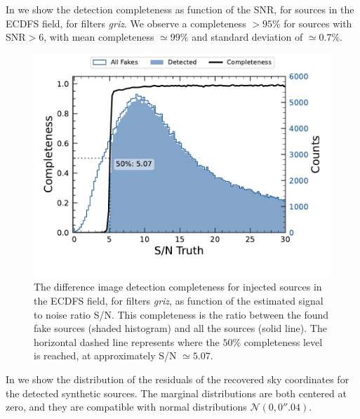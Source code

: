 In  we show the detection completeness as function of the \gls{SNR}, for sources in the \gls{ECDFS} field, for filters \textit{griz}. We observe a completeness $>95\%$ for sources with \gls{SNR}$> 6$, with mean completeness $\simeq 99\%$ and standard deviation of $\simeq 0.7\%$.
%
\begin{figure}[htb!]
\centering
\includegraphics[width=0.98\linewidth]{figures/efficiency_snr_griz.pdf}
\caption{The difference image detection completeness for injected sources in the \gls{ECDFS} field, for filters \textit{griz}, as function of the estimated signal to noise ratio S/N. This completeness is the ratio between the found fake sources (shaded histogram) and all the sources (solid line). The horizontal dashed line represents where the $50\%$ completeness level is reached, at approximately S/N $\simeq 5.07$.}
\label{fig:eff_snr_griz}
\vspace{0.1cm}
\end{figure}
%
In  we show the distribution of the residuals of the recovered sky coordinates for the detected synthetic sources. The marginal distributions are both centered at zero, and they are compatible with normal distributions $\mathcal{N}(0, 0''.04)$.
%
